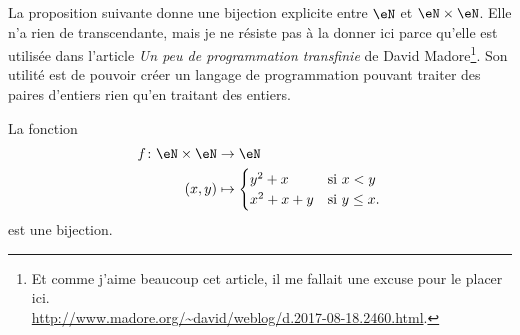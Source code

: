 \begin{normaltext}
    La proposition suivante donne une bijection explicite entre \( \eN\) et \( \eN\times \eN\). Elle n'a rien de transcendante, mais je ne résiste pas à la donner ici parce qu'elle est utilisée dans l'article \emph{Un peu de programmation transfinie} de David Madore\footnote{Et comme j'aime beaucoup cet article, il me fallait une excuse pour le placer ici.\\ \url{http://www.madore.org/~david/weblog/d.2017-08-18.2460.html}.}. Son utilité est de pouvoir créer un langage de programmation pouvant traiter des paires d'entiers rien qu'en traitant des entiers.
\end{normaltext}
\begin{proposition}        \label{PROPooLPKUooAlsYJg}
    La fonction
    \begin{equation}
        \begin{aligned}
            f\colon \eN\times \eN&\to \eN \\
            (x,y)&\mapsto \begin{cases}
                y^2+x    &   \text{si } x<y\\
                x^2+x+y    &    \text{si } y\leq x.
            \end{cases}
        \end{aligned}
    \end{equation}
    est une bijection.
\end{proposition}

